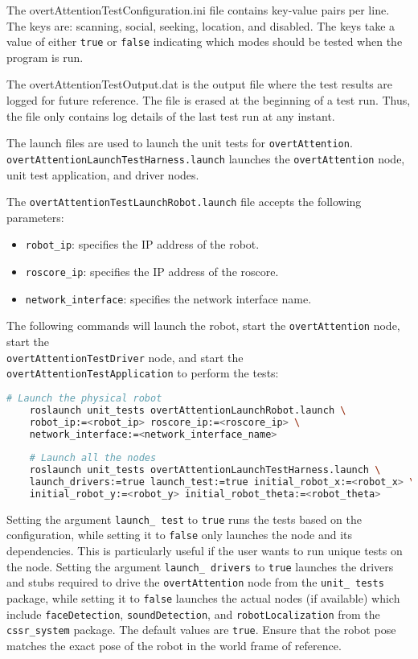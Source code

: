 \documentclass{CSSRforAfrica}
\begin{document}
The overtAttentionTestConfiguration.ini file contains key-value pairs per line. The keys are: scanning, social, seeking, location, and disabled.  The keys take a value of either \texttt{true} or \texttt{false} indicating which modes should be tested when the program is run.

The overtAttentionTestOutput.dat is the output file where the test results are logged for future reference. The file is erased at the beginning of a test run. Thus, the file only contains log details of the last test run at any instant.

The launch files are used to launch the unit tests for \texttt{overtAttention}. \\ \texttt{overtAttentionLaunchTestHarness.launch} launches the \texttt{overtAttention} node, unit test application, and driver nodes.

The \texttt{overtAttentionTestLaunchRobot.launch} file accepts the following parameters:
\begin{itemize}
	\setlength\itemsep{0em}
	\item \texttt{robot\_ip}: specifies the IP address of the robot.
	\item \texttt{roscore\_ip}: specifies the IP address of the roscore.
	\item \texttt{network\_interface}: specifies the network interface name.
\end{itemize}

\newpage

The following commands will launch the robot, start the \texttt{overtAttention} node, start the\\ \texttt{overtAttentionTestDriver} node, and start the \texttt{overtAttentionTestApplication} to perform the tests:

\begin{lstlisting}[style=withoutNumbering, language=bash]
	# Launch the physical robot
	roslaunch unit_tests overtAttentionLaunchRobot.launch \
	robot_ip:=<robot_ip> roscore_ip:=<roscore_ip> \
	network_interface:=<network_interface_name>
	
	# Launch all the nodes
	roslaunch unit_tests overtAttentionLaunchTestHarness.launch \
	launch_drivers:=true launch_test:=true initial_robot_x:=<robot_x> \
	initial_robot_y:=<robot_y> initial_robot_theta:=<robot_theta>
\end{lstlisting}

 \noindent {\color{red} \textbf{NOTE:}} 
Setting the argument \texttt{launch\_ test} to \texttt{true} runs the tests based on the configuration, while setting it to \texttt{false} only launches the node and its dependencies. This is particularly useful if the user wants to run unique tests on the node. Setting the argument \texttt{launch\_ drivers} to \texttt{true} launches the drivers and stubs required to drive the \texttt{overtAttention} node from the \texttt{unit\_ tests} package, while setting it to \texttt{false} launches the actual nodes (if available) which include \texttt{faceDetection}, \texttt{soundDetection}, and \texttt{robotLocalization} from the \texttt{cssr\_system} package. The default values are \texttt{true}. Ensure that the robot pose matches the exact pose of the robot in the world frame of reference.
\end{document}
